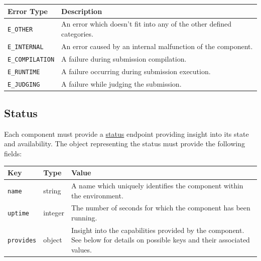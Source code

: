 \documentclass[11pt,letterpaper]{article}
\begin{document}
\begin{tabulary}{\textwidth}{ | l | L | }
    \hline
    \textbf{Error Type} & \textbf{Description} \\
    \hline
    \texttt{E\_OTHER} & An error which doesn't fit into any of the other
        defined categories. \\
    \hline
    \texttt{E\_INTERNAL} & An error caused by an internal malfunction of the
        component. \\
    \hline
    \texttt{E\_COMPILATION} & A failure during submission compilation. \\
    \hline
    \texttt{E\_RUNTIME} & A failure occurring during submission execution. \\
    \hline
    \texttt{E\_JUDGING} & A failure while judging the submission. \\
    \hline
\end{tabulary}

\subsection{Status}
\label{formats-status}

Each component must provide a \hyperref[endpoints-common]{status} endpoint
providing insight into its state and availability. The object representing the
status must provide the following fields:

\begin{tabulary}{\textwidth}{ | l | l | L | }
    \hline
    \textbf{Key} & \textbf{Type} & \textbf{Value} \\
    \hline
    \texttt{name} & string & A name which uniquely identifies the component
        within the environment. \\
    \hline
    \texttt{uptime} & integer & The number of seconds for which the component
        has been running. \\
    \hline
    \texttt{provides} & object & Insight into the capabilities provided by the
        component. See below for details on possible keys and their associated
        values. \\
    \hline
\end{tabulary}
\end{document}
